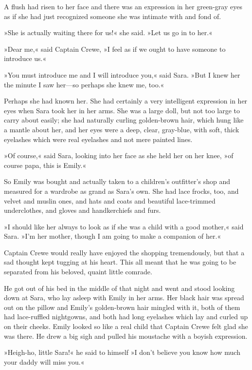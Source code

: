 A flush had risen to her face and there was an expression in her green-gray eyes as if she had just recognized someone she was intimate with and fond of.

»She is actually waiting there for us!« she said. »Let us go in to her.«

»Dear me,« said Captain Crewe, »I feel as if we ought to have someone to introduce us.«

»You must introduce me and I will introduce you,« said Sara. »But I knew her the minute I saw her—so perhaps she knew me, too.«

Perhaps she had known her. She had certainly a very intelligent expression in her eyes when Sara took her in her arms. She was a large doll, but not too large to carry about easily; she had naturally curling golden-brown hair, which hung like a mantle about her, and her eyes were a deep, clear, gray-blue, with soft, thick eyelashes which were real eyelashes and not mere painted lines.

»Of course,« said Sara, looking into her face as she held her on her knee, »of course papa, this is Emily.«

So Emily was bought and actually taken to a children's outfitter's shop and measured for a wardrobe as grand as Sara's own. She had lace frocks, too, and velvet and muslin ones, and hats and coats and beautiful lace-trimmed underclothes, and gloves and handkerchiefs and furs.

»I should like her always to look as if she was a child with a good mother,« said Sara. »I'm her mother, though I am going to make a companion of her.«

Captain Crewe would really have enjoyed the shopping tremendously, but that a sad thought kept tugging at his heart. This all meant that he was going to be separated from his beloved, quaint little comrade.

He got out of his bed in the middle of that night and went and stood looking down at Sara, who lay asleep with Emily in her arms. Her black hair was spread out on the pillow and Emily's golden-brown hair mingled with it, both of them had lace-ruffled nightgowns, and both had long eyelashes which lay and curled up on their cheeks. Emily looked so like a real child that Captain Crewe felt glad she was there. He drew a big sigh and pulled his moustache with a boyish expression.

»Heigh-ho, little Sara!« he said to himself »I don't believe you know how much your daddy will miss you.«

